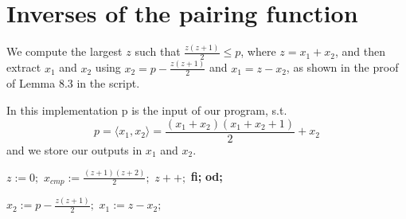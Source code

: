 

\usepackage{algorithm}
\usepackage[noend]{algpseudocode}
\usepackage{float} %

\setcounter{section}{3}

\section{Inverses of the pairing function}
We compute the largest \( z \) such that \( \frac{z(z+1)}{2} \leq p \), where \( z = x_1 + x_2 \), and then extract \( x_1 \) and \( x_2 \) using \( x_2 = p - \frac{z(z+1)}{2} \) and \( x_1 = z - x_2 \), as shown in the proof of Lemma 8.3 in the script.


In this implementation p is the input of our program, s.t.
\[
p = \langle x_1, x_2 \rangle = \frac{(x_1 + x_2)(x_1 + x_2 + 1)}{2} + x_2
\] and we store our outputs in $x_1$ and $x_2$.



\begin{algorithmic}[1]
\State \( z := 0; \) 
    \State \( x_{cmp} := \frac{(z + 1)(z + 2)}{2}; \) 
        \State \( z++; \) 
    \EndIf \textbf{fi;}
\EndFor \textbf{od;}

\State \( x_2 := p - \frac{z(z + 1)}{2}; \)
\State \( x_1 := z - x_2; \) 
\end{algorithmic}




